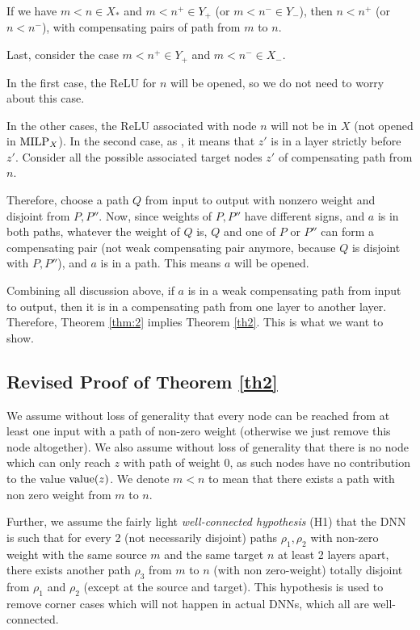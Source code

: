 	\begin{lemma}
	If we have $m<n \in X_*$ and $m < n^+ \in Y_+$ (or $m < n^- \in Y_-$),
	then $n < n^+$ (or $n < n^-$), with compensating pairs of path from $m$ to $n$.
	\end{lemma}
	
	Last, consider the case $m<n^+ \in Y_+$ and $m < n^- \in X_-$.
	



In the first case, the ReLU for $n$ will be opened, so we do not need to worry about this case.
			
			In the other cases, the ReLU associated with node $n$ will not be in $X$ 
			(not opened in ${\textrm{MILP}}_X$).
			In the second case, as 
			, it means that $z'$ is in a layer strictly before $z'$.
			Consider all the possible associated target nodes $z'$ of compensating path from $n$.

			
			Therefore, choose a path $Q$ from input to output with nonzero weight and disjoint from $P,P''$. Now, since weights of $P,P''$ have different signs, and $a$ is in both paths, whatever the weight of $Q$ is, $Q$ and one of  $P$ or $P''$ can form a compensating pair (not weak compensating pair anymore, because $Q$ is disjoint with $P,P''$), and $a$ is in a path. This means $a$ will be opened.
			
			Combining all discussion above, if $a$ is in a weak compensating path from input to output, then it is in a compensating path from one layer to another layer. Therefore, Theorem \ref{thm:2} implies Theorem \ref{th2}. This is what we want to show.
			\fi
			

 			
		
			

\newpage

	
\subsection{Revised Proof of Theorem \ref{th2}}
			
We assume without loss of generality that every node can be reached from at least one input with a path of non-zero weight (otherwise we just remove this node altogether).
We also assume without loss of generality that there is no node which can only reach $z$ with path of weight $0$, as such nodes have no contribution to the value ${\textrm{value}}(z)$. We denote $m<n$ to mean that there exists a path with non zero weight from $m$ to $n$.

Further, we assume the fairly light {\em well-connected hypothesis} (H1) that the DNN is such that for every 2 (not necessarily disjoint) paths $\rho_1,\rho_2$ with non-zero weight with the same source $m$ and the same target $n$ at least 2 layers apart, there exists another path $\rho_3$ from $m$ to $n$ (with non zero-weight) totally disjoint from $\rho_1$ and $\rho_2$ (except at the source and target). This hypothesis is used to remove corner cases 
which will not happen in actual DNNs, which all are well-connected.

